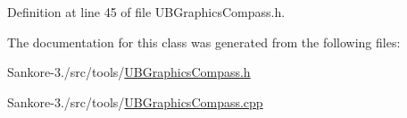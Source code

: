 Definition at line 45 of file U\-B\-Graphics\-Compass.\-h.



The documentation for this class was generated from the following files\-:\begin{DoxyCompactItemize}
\item 
Sankore-\/3./src/tools/\hyperlink{_u_b_graphics_compass_8h}{U\-B\-Graphics\-Compass.\-h}\item 
Sankore-\/3./src/tools/\hyperlink{_u_b_graphics_compass_8cpp}{U\-B\-Graphics\-Compass.\-cpp}\end{DoxyCompactItemize}
